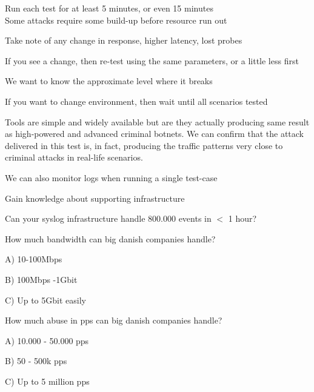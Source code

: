 \documentclass[20pt,landscape,a4paper,footrule]{foils}
\begin{document}
\begin{list1}
\item Run each test for at least 5 minutes, or even 15 minutes\\
Some attacks require some build-up before resource run out
\item Take note of any change in response, higher latency, lost probes
\item If you see a change, then re-test using the same parameters, or a little less first
\item We want to know the approximate level where it breaks
\item If you want to change environment, then wait until all scenarios tested
\end{list1}


Tools are simple and widely available but are they actually producing same result as high-powered and advanced criminal botnets. We can confirm that the attack delivered in this test is, in fact, producing the traffic patterns very close to criminal attacks in real-life scenarios.

\begin{list2}
\item We can also monitor logs when running a single test-case
\item Gain knowledge about supporting infrastructure
\item Can your syslog infrastructure handle 800.000 events in $<$ 1 hour?
\end{list2}


How much bandwidth can big danish companies handle?
\begin{list2}
\item A) 10-100Mbps
\item B) 100Mbps -1Gbit
\item C) Up to 5Gbit easily
\end{list2}

How much abuse in pps can big danish companies handle?
\begin{list2}
\item A) 10.000 - 50.000 pps
\item B) 50 - 500k pps
\item C) Up to 5 million pps
\end{list2}

\end{document}
